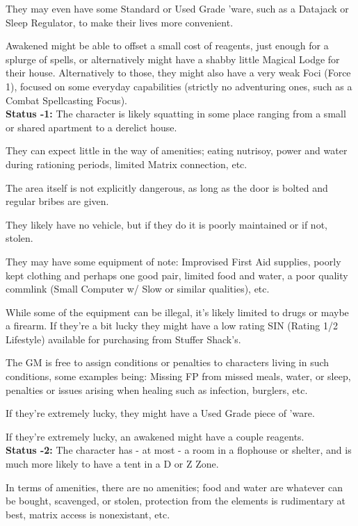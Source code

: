 \begin{multicols*}{2}
	They may even have some Standard or Used Grade 'ware, such as a Datajack or Sleep Regulator, to make their lives more convenient.
	
	Awakened might be able to offset a small cost of reagents, just enough for a splurge of spells, or alternatively might have a shabby little Magical Lodge for their house. Alternatively to those, they might also have a very weak Foci (Force 1), focused on some everyday capabilities (strictly no adventuring ones, such as a Combat Spellcasting Focus).\\
	
	\textbf{Status -1:} The character is likely squatting in some place ranging from a small or shared apartment to a derelict house. 
	
	They can expect little in the way of amenities; eating nutrisoy, power and water during rationing periods, limited Matrix connection, etc. 
	
	The area itself is not explicitly dangerous, as long as the door is bolted and regular bribes are given. 
	
	They likely have no vehicle, but if they do it is poorly maintained or if not, stolen. 
	
	They may have some equipment of note: Improvised First Aid supplies, poorly kept clothing and perhaps one good pair, limited food and water, a poor quality commlink (Small Computer w/ Slow or similar qualities), etc. 
	
	While some of the equipment can be illegal, it's likely limited to drugs or maybe a firearm. If they're a bit lucky they might have a low rating SIN (Rating 1/2 Lifestyle) available for purchasing from Stuffer Shack's.
	
	The GM is free to assign conditions or penalties to characters living in such conditions, some examples being: Missing FP from missed meals, water, or sleep, penalties or issues arising when healing such as infection, burglers, etc. 
	
	If they're extremely lucky, they might have a Used Grade piece of 'ware.
	
	If they're extremely lucky, an awakened might have a couple reagents.\\
	
	\textbf{Status -2:} The character has - at most - a room in a flophouse or shelter, and is much more likely to have a tent in a D or Z Zone. 
	
	In terms of amenities, there are no amenities; food and water are whatever can be bought, scavenged, or stolen, protection from the elements is rudimentary at best, matrix access is nonexistant, etc. 
	

\end{multicols*}
